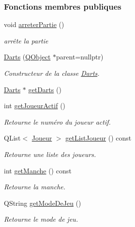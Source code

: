\subsubsection*{Fonctions membres publiques}
\begin{DoxyCompactItemize}
\item 
void \hyperlink{class_darts_aa9685f754172d995cdd04d39d9651227}{arreter\+Partie} ()
\begin{DoxyCompactList}\small\item\em arrête la partie \end{DoxyCompactList}\item 
\hyperlink{class_darts_aaa3365c94f97e58a61a05082d0d324d7}{Darts} (\hyperlink{class_q_object}{Q\+Object} $\ast$parent=nullptr)
\begin{DoxyCompactList}\small\item\em Constructeur de la classe \hyperlink{class_darts}{Darts}. \end{DoxyCompactList}\item 
\hyperlink{class_darts}{Darts} $\ast$ \hyperlink{class_darts_a6548d12f81017792cf46b25f68fc5df8}{get\+Darts} ()
\item 
int \hyperlink{class_darts_a20ddfd28c8355c06a90cc23abff3de11}{get\+Joueur\+Actif} ()
\begin{DoxyCompactList}\small\item\em Retourne le numéro du joueur actif. \end{DoxyCompactList}\item 
Q\+List$<$ \hyperlink{class_joueur}{Joueur} $>$ \hyperlink{class_darts_a0525b09703d3461bf5570197354743c3}{get\+List\+Joueur} () const
\begin{DoxyCompactList}\small\item\em Retourne une liste des joueurs. \end{DoxyCompactList}\item 
int \hyperlink{class_darts_a2ce03c887d90f3a997648981d342b50c}{get\+Manche} () const
\begin{DoxyCompactList}\small\item\em Retourne la manche. \end{DoxyCompactList}\item 
Q\+String \hyperlink{class_darts_a49ea4ca23fd03d80f5a95257c6fe8478}{get\+Mode\+De\+Jeu} ()
\begin{DoxyCompactList}\small\item\em Retourne le mode de jeu. \end{DoxyCompactList}\item 

\end{DoxyCompactItemize}
